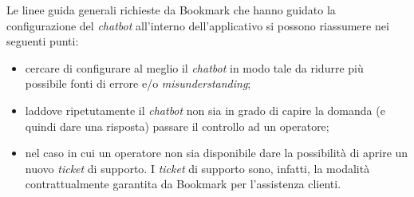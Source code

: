 Le linee guida generali richieste da Bookmark che hanno guidato la configurazione del \textit{chatbot} all'interno dell'applicativo si possono riassumere nei seguenti punti:
\begin{itemize}
    \item cercare di configurare al meglio il \textit{chatbot} in modo tale da ridurre più possibile fonti di errore e/o \textit{misunderstanding};
    \item laddove ripetutamente il \textit{chatbot} non sia in grado di capire la domanda (e quindi dare una risposta) passare il controllo ad un operatore;
    \item nel caso in cui un operatore non sia disponibile dare la possibilità di aprire un nuovo \textit{ticket} di supporto. I \textit{ticket} di supporto sono, infatti, la modalità contrattualmente garantita da Bookmark per l'assistenza clienti.
\end{itemize}

